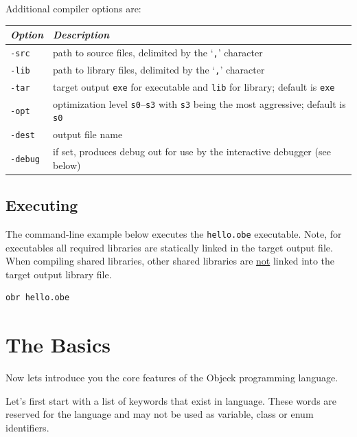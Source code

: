 \documentclass[12pt]{article}
\begin{document}
Additional compiler options are:
\begin{center}
\begin{tabular}{| l | l |}
\hline
\emph{Option} & \emph{Description} \\ \hline \hline
\texttt{-src} & path to source files, delimited by the `\texttt{,}' character \\ \hline
\texttt{-lib} & path to library files, delimited by the `\texttt{,}'
character\\ \hline
\texttt{-tar} & target output \texttt{exe} for executable and \texttt{lib} for library; default is  \texttt{exe} \\ \hline
\texttt{-opt} & optimization level \texttt{s0}--\texttt{s3} with \texttt{s3} being the most aggressive; default is \texttt{s0} \\ \hline
\texttt{-dest} & output file name \\ \hline
\texttt{-debug} & if set, produces debug out for use by the interactive debugger (see below) \\ \hline
\end{tabular}
\end{center}

\subsection{Executing}
The command-line example below executes the \texttt{hello.obe} executable. Note, for executables all required libraries are statically linked in the target output file.  When compiling shared libraries, other shared libraries are \underline{not} linked into the target output library file.

\begin{verbatim}
obr hello.obe
\end{verbatim}

\section{The Basics}
Now lets introduce you the core features of the Objeck programming language.
\vspace{\baselineskip}

Let's first start with a list of keywords that exist in language.
These words are reserved for the language and may not be used as
variable, class or enum identifiers.
\end{document}
